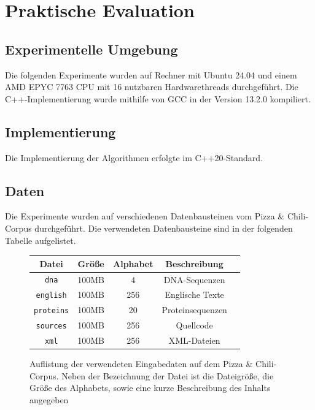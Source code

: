 \chapter{Praktische Evaluation}

\section{Experimentelle Umgebung}
Die folgenden Experimente wurden auf Rechner mit Ubuntu 24.04 und einem AMD EPYC 7763 CPU mit 16 nutzbaren Hardwarethreads durchgeführt. Die C++-Implementierung wurde
mithilfe von GCC in der Version 13.2.0 kompiliert.

\section{Implementierung}
Die Implementierung der Algorithmen erfolgte im C++20-Standard.

\section{Daten}
Die Experimente wurden auf verschiedenen Datenbausteinen vom Pizza \& Chili-Corpus durchgeführt. Die verwendeten Datenbausteine sind in der folgenden Tabelle aufgelistet.

\begin{figure}
    \centering
    \caption{Auflistung der verwendeten Eingabedaten auf dem Pizza \& Chili-Corpus. Neben der Bezeichnung der Datei ist die Dateigröße, die Größe des Alphabets, sowie eine kurze 
    Beschreibung des Inhalts angegeben}
    \begin{tabular}{|c|c|c|c|c|}
        \hline
        \textbf{Datei} & \textbf{Größe} & \textbf{Alphabet} & \textbf{Beschreibung} \\
        \hline
        \hline
        \texttt{dna} & 100MB & 4 & DNA-Sequenzen \\
        \hline
        \texttt{english} & 100MB & 256 & Englische Texte \\
        \hline
        \texttt{proteins} & 100MB & 20 & Proteinsequenzen \\
        \hline
        \texttt{sources} & 100MB & 256 & Quellcode \\
        \hline
        \texttt{xml} & 100MB & 256 & XML-Dateien \\
        \hline
    \end{tabular}
\end{figure}

